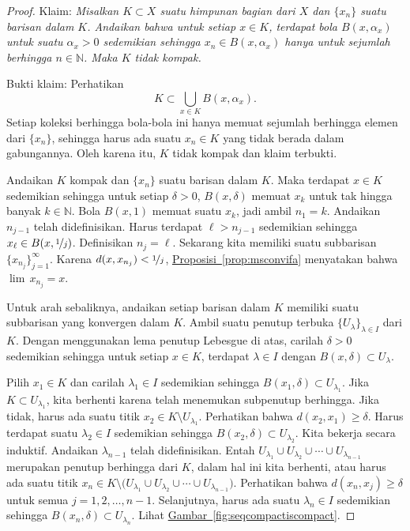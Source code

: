 \documentclass[12pt,openany]{book}
\newcommand{\N}{{\mathbb{N}}}
\theoremstyle{plain}
\theoremstyle{remark}
\theoremstyle{definition}
\theoremstyle{exercise}
\theoremstyle{example}
\newcommand{\figureref}[1]{\hyperref[#1]{Gambar~\ref*{#1}}}
\newcommand{\propref}[1]{\hyperref[#1]{Proposisi~\ref*{#1}}}
\begin{document}
\begin{proof}
Klaim: \emph{Misalkan $K \subset X$ suatu himpunan bagian dari $X$ dan
$\{ x_n \}$ suatu barisan dalam $K$. Andaikan bahwa untuk setiap $x \in K$,
terdapat bola $B(x,\alpha_x)$ untuk suatu $\alpha_x > 0$ sedemikian sehingga
$x_n \in B(x,\alpha_x)$ hanya untuk sejumlah berhingga $n \in \N$.
Maka $K$ tidak kompak.}

Bukti klaim:
Perhatikan
\begin{equation*}
K \subset \bigcup_{x \in K} B(x,\alpha_x) .
\end{equation*}
Setiap koleksi berhingga bola-bola ini hanya memuat sejumlah berhingga
elemen dari $\{ x_n \}$,
sehingga harus ada suatu $x_n \in K$
yang tidak berada dalam gabungannya. Oleh karena itu, $K$ tidak kompak dan klaim
terbukti.

Andaikan $K$ kompak dan $\{ x_n \}$ suatu barisan dalam $K$.
Maka terdapat $x \in K$ sedemikian sehingga
untuk setiap $\delta > 0$,
$B(x,\delta)$ memuat $x_k$ untuk tak hingga banyak $k \in \N$.
Bola $B(x,1)$ memuat suatu $x_k$, jadi ambil $n_1 = k$.
Andaikan $n_{j-1}$ telah didefinisikan.
Harus terdapat $\ell > n_{j-1}$
sedemikian sehingga $x_\ell \in B(x,\nicefrac{1}{j})$. Definisikan
$n_j = \ell$.
Sekarang kita memiliki suatu subbarisan $\{ x_{n_j} \}_{j=1}^\infty$.
Karena
$d(x,x_{n_j}) < \nicefrac{1}{j}$, \propref{prop:msconvifa} menyatakan bahwa
$\lim\, x_{n_j} = x$.

Untuk arah sebaliknya, andaikan setiap barisan dalam $K$
memiliki suatu
subbarisan yang konvergen dalam $K$.
Ambil
suatu penutup terbuka $\{ U_\lambda \}_{\lambda \in I}$ dari $K$.
Dengan menggunakan lema penutup Lebesgue di atas, carilah $\delta > 0$
sedemikian sehingga untuk setiap $x \in K$, terdapat $\lambda \in I$ dengan
$B(x,\delta) \subset U_\lambda$.

Pilih $x_1 \in K$ dan carilah $\lambda_1 \in I$ sedemikian sehingga $B(x_1,\delta) \subset
U_{\lambda_1}$.
Jika $K \subset U_{\lambda_1}$, kita berhenti karena telah menemukan
subpenutup berhingga.
Jika tidak, harus ada
suatu titik $x_2 \in K \setminus U_{\lambda_1}$.
Perhatikan bahwa $d(x_2,x_1) \geq \delta$.
Harus terdapat suatu $\lambda_2 \in I$ sedemikian sehingga
$B(x_2,\delta) \subset U_{\lambda_2}$.
Kita bekerja secara induktif. Andaikan $\lambda_{n-1}$ telah didefinisikan.
Entah
$U_{\lambda_1} \cup
U_{\lambda_2} \cup \cdots \cup
U_{\lambda_{n-1}}$ merupakan penutup berhingga dari $K$, dalam hal ini kita
berhenti, atau
harus ada
suatu titik $x_n \in K \setminus \bigl( U_{\lambda_1} \cup
U_{\lambda_2} \cup \cdots \cup
U_{\lambda_{n-1}}\bigr)$.
Perhatikan bahwa $d(x_n,x_j) \geq \delta$ untuk semua $j = 1,2,\ldots,n-1$.
Selanjutnya, harus ada suatu $\lambda_n \in I$
sedemikian sehingga $B(x_n,\delta) \subset U_{\lambda_n}$.
Lihat \figureref{fig:seqcompactiscompact}.


\end{proof}
\end{document}
